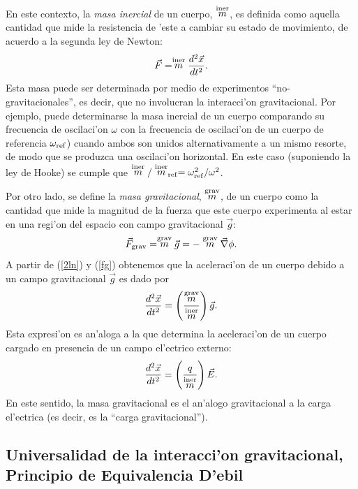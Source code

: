 En este contexto, la \textit{masa inercial} de un cuerpo, $\stackrel{\rm iner}{m}$, es definida como aquella cantidad que mide la resistencia de 'este a cambiar su estado de movimiento, de acuerdo a la segunda ley de Newton:
\begin{equation}\label{2ln}
\vec{F}=\stackrel{\rm iner}{m}\frac{d^2\vec{x}}{dt^2}.
\end{equation}
Esta masa puede ser determinada por medio de experimentos ``no-gravitacionales'', es decir, que no involucran la interacci'on gravitacional. Por ejemplo, puede determinarse la masa inercial de un cuerpo comparando su frecuencia de oscilaci'on $\omega$ con la frecuencia de oscilaci'on de un cuerpo de referencia $\omega_{\rm ref}$) cuando ambos son unidos alternativamente a un mismo resorte, de modo que se produzca una oscilaci'on horizontal. En este caso (suponiendo la ley de Hooke) se cumple que $\stackrel{\rm iner}{m}/\stackrel{\rm iner}{m}_{\rm ref}=\omega_{\rm ref}^2/\omega^2$.

Por otro lado, se define la \textit{masa gravitacional}, $\stackrel{\rm grav}{m}$, de un cuerpo como la cantidad que mide la magnitud de la fuerza que este cuerpo experimenta al estar en una regi'on del espacio con campo gravitacional $\vec{g}$:
\begin{equation}\label{fg}
\vec{F}_{\rm grav}=\stackrel{\rm grav}{m}\vec{g}=-\stackrel{\rm grav}{m}\vec\nabla\phi.
\end{equation}
A partir de (\ref{2ln}) y (\ref{fg}) obtenemos que la aceleraci'on de un cuerpo debido a un campo gravitacional $\vec{g}$ es dado por
\begin{equation}\label{amimg}
\frac{d^2\vec{x}}{dt^2}=\left(\frac{\stackrel{\rm grav}{m}}{\stackrel{\rm iner}{m}}\right)\vec{g}.
\end{equation}
Esta expresi'on es an'aloga a la que determina la aceleraci'on de un cuerpo cargado en presencia de un campo el'ectrico externo:
\begin{equation}\label{aqE}
\frac{d^2\vec{x}}{dt^2}=\left(\frac{q}{\stackrel{\rm iner}{m}}\right)\vec{E}.
\end{equation}
En este sentido, la masa gravitacional es el an'alogo gravitacional a la carga el'ectrica (es decir, es la ``carga gravitacional'').


\subsection{Universalidad de la interacci'on gravitacional, Principio de Equivalencia D'ebil}

